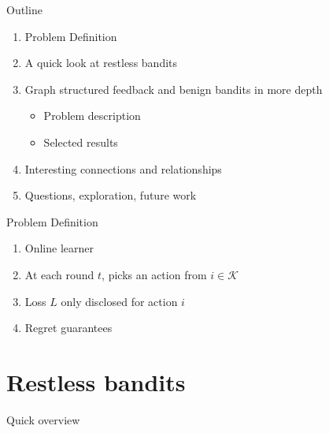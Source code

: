 \documentclass{beamer}
\begin{document}
\begin{frame}{Outline}
  \begin{enumerate}

  \item Problem Definition
  
  \item
    A quick look at restless bandits
    
  \item
    Graph structured feedback and benign bandits in more depth
    \begin{itemize}
    \item
      Problem description
    \item
      Selected results
    \end{itemize}
    
  \item
    Interesting connections and relationships 
  \item
    Questions, exploration, future work
    
  \end{enumerate}
\end{frame}


\begin{frame}{Problem Definition}
  \begin{enumerate}
    \item Online learner
    \item At each round $t$, picks an action from $i\in\mathcal{K}$
    \item Loss $L$ only disclosed for action $i$
    \item Regret guarantees
  \end{enumerate}
\end{frame}


\section{Restless bandits}

\begin{frame}{Quick overview}
\end{frame}
\end{document}
